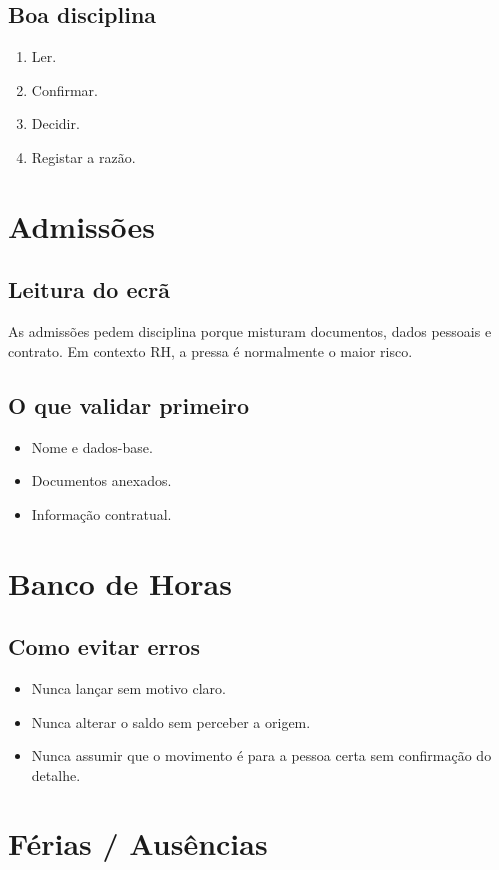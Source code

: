 \subsection{Boa disciplina}
\begin{enumerate}
  \item Ler.
  \item Confirmar.
  \item Decidir.
  \item Registar a razão.
\end{enumerate}

\section{Admissões}
\subsection{Leitura do ecrã}
As admissões pedem disciplina porque misturam documentos, dados pessoais e contrato. Em contexto RH, a pressa é normalmente o maior risco.

\subsection{O que validar primeiro}
\begin{itemize}
  \item Nome e dados-base.
  \item Documentos anexados.
  \item Informação contratual.
\end{itemize}

\section{Banco de Horas}
\subsection{Como evitar erros}
\begin{itemize}
  \item Nunca lançar sem motivo claro.
  \item Nunca alterar o saldo sem perceber a origem.
  \item Nunca assumir que o movimento é para a pessoa certa sem confirmação do detalhe.
\end{itemize}

\section{Férias / Ausências}
